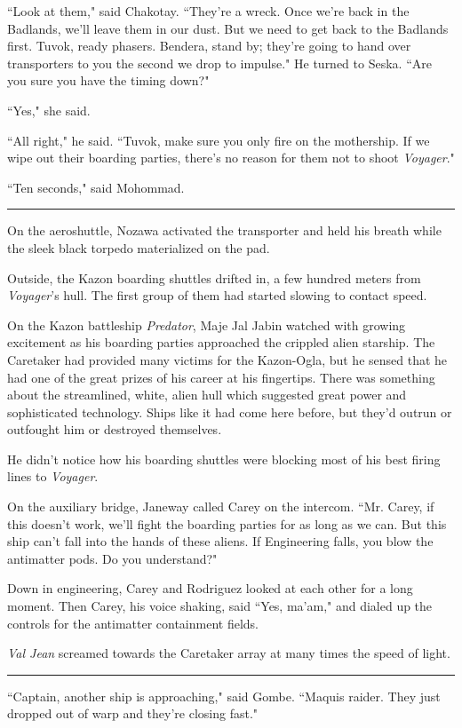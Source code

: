 \documentclass[twoside,letterpaper,12pt]{memoir}
\begin{document}
``Look at them," said Chakotay. ``They're a wreck. Once we're back in the Badlands, we'll leave them in our dust. But we need to get back to the Badlands first. Tuvok, ready phasers. Bendera, stand by; they're going to hand over transporters to you the second we drop to impulse." He turned to Seska. ``Are you sure you have the timing down?"

``Yes," she said.

``All right," he said. ``Tuvok, make sure you only fire on the mothership. If we wipe out their boarding parties, there's no reason for them not to shoot \textit{Voyager}."

``Ten seconds," said Mohommad.

\fancybreak{\rule{3cm}{0.4 pt}}
On the aeroshuttle, Nozawa activated the transporter and held his breath while the sleek black torpedo materialized on the pad.

Outside, the Kazon boarding shuttles drifted in, a few hundred meters from \textit{Voyager}'s hull. The first group of them had started slowing to contact speed.

On the Kazon battleship \textit{Predator}, Maje Jal Jabin watched with growing excitement as his boarding parties approached the crippled alien starship. The Caretaker had provided many victims for the Kazon-Ogla, but he sensed that he had one of the great prizes of his career at his fingertips. There was something about the streamlined, white, alien hull which suggested great power and sophisticated technology. Ships like it had come here before, but they'd outrun or outfought him or destroyed themselves.

He didn't notice how his boarding shuttles were blocking most of his best firing lines to \textit{Voyager}.

On the auxiliary bridge, Janeway called Carey on the intercom. ``Mr. Carey, if this doesn't work, we'll fight the boarding parties for as long as we can. But this ship can't fall into the hands of these aliens. If Engineering falls, you blow the antimatter pods. Do you understand?"

Down in engineering, Carey and Rodriguez looked at each other for a long moment. Then Carey, his voice shaking, said ``Yes, ma'am," and dialed up the controls for the antimatter containment fields.

\textit{Val Jean} screamed towards the Caretaker array at many times the speed of light.

\fancybreak{\rule{3cm}{0.4 pt}}
``Captain, another ship is approaching," said Gombe. ``Maquis raider. They just dropped out of warp and they're closing fast."
\end{document}
